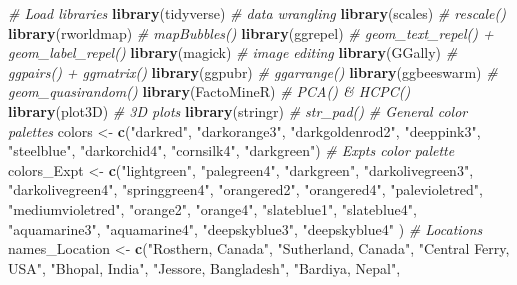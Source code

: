 \documentclass[
]{article}
\newenvironment{Shaded}{\begin{snugshade}}{\end{snugshade}}
\newcommand{\CommentTok}[1]{\textcolor[rgb]{0.56,0.35,0.01}{\textit{#1}}}
\newcommand{\KeywordTok}[1]{\textcolor[rgb]{0.13,0.29,0.53}{\textbf{#1}}}
\newcommand{\NormalTok}[1]{#1}
\newcommand{\StringTok}[1]{\textcolor[rgb]{0.31,0.60,0.02}{#1}}
\begin{document}
\begin{Shaded}
\begin{Highlighting}[]
\CommentTok{# Load libraries}
\KeywordTok{library}\NormalTok{(tidyverse)  }\CommentTok{# data wrangling}
\KeywordTok{library}\NormalTok{(scales)     }\CommentTok{# rescale()}
\KeywordTok{library}\NormalTok{(rworldmap)  }\CommentTok{# mapBubbles()}
\KeywordTok{library}\NormalTok{(ggrepel)    }\CommentTok{# geom_text_repel() + geom_label_repel()}
\KeywordTok{library}\NormalTok{(magick)     }\CommentTok{# image editing}
\KeywordTok{library}\NormalTok{(GGally)     }\CommentTok{# ggpairs() + ggmatrix()}
\KeywordTok{library}\NormalTok{(ggpubr)     }\CommentTok{# ggarrange()}
\KeywordTok{library}\NormalTok{(ggbeeswarm) }\CommentTok{# geom_quasirandom()}
\KeywordTok{library}\NormalTok{(FactoMineR) }\CommentTok{# PCA() & HCPC()}
\KeywordTok{library}\NormalTok{(plot3D)     }\CommentTok{# 3D plots}
\KeywordTok{library}\NormalTok{(stringr)    }\CommentTok{# str_pad()}
\CommentTok{# General color palettes }
\NormalTok{colors <-}\StringTok{ }\KeywordTok{c}\NormalTok{(}\StringTok{"darkred"}\NormalTok{,   }\StringTok{"darkorange3"}\NormalTok{, }\StringTok{"darkgoldenrod2"}\NormalTok{, }\StringTok{"deeppink3"}\NormalTok{, }
            \StringTok{"steelblue"}\NormalTok{, }\StringTok{"darkorchid4"}\NormalTok{, }\StringTok{"cornsilk4"}\NormalTok{,      }\StringTok{"darkgreen"}\NormalTok{) }
\CommentTok{# Expts color palette}
\NormalTok{colors_Expt <-}\StringTok{ }\KeywordTok{c}\NormalTok{(}\StringTok{"lightgreen"}\NormalTok{,      }\StringTok{"palegreen4"}\NormalTok{,       }\StringTok{"darkgreen"}\NormalTok{,   }\StringTok{"darkolivegreen3"}\NormalTok{,}
                 \StringTok{"darkolivegreen4"}\NormalTok{, }\StringTok{"springgreen4"}\NormalTok{,     }\StringTok{"orangered2"}\NormalTok{,  }\StringTok{"orangered4"}\NormalTok{,}
                 \StringTok{"palevioletred"}\NormalTok{,    }\StringTok{"mediumvioletred"}\NormalTok{, }\StringTok{"orange2"}\NormalTok{,     }\StringTok{"orange4"}\NormalTok{, }
                 \StringTok{"slateblue1"}\NormalTok{,       }\StringTok{"slateblue4"}\NormalTok{,      }\StringTok{"aquamarine3"}\NormalTok{, }\StringTok{"aquamarine4"}\NormalTok{, }
                 \StringTok{"deepskyblue3"}\NormalTok{,     }\StringTok{"deepskyblue4"}\NormalTok{ )}
\CommentTok{# Locations}
\NormalTok{names_Location <-}\StringTok{ }\KeywordTok{c}\NormalTok{(}\StringTok{"Rosthern, Canada"}\NormalTok{, }\StringTok{"Sutherland, Canada"}\NormalTok{,  }\StringTok{"Central Ferry, USA"}\NormalTok{,}
                    \StringTok{"Bhopal, India"}\NormalTok{,    }\StringTok{"Jessore, Bangladesh"}\NormalTok{, }\StringTok{"Bardiya, Nepal"}\NormalTok{,}

\end{Highlighting}
\end{Shaded}
\end{document}
